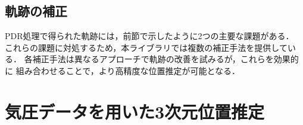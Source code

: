 


\subsection{軌跡の補正}

PDR処理で得られた軌跡には，前節で示したように2つの主要な課題がある．
これらの課題に対処するため，本ライブラリでは複数の補正手法を提供している．
各補正手法は異なるアプローチで軌跡の改善を試みるが，これらを効果的に
組み合わせることで，より高精度な位置推定が可能となる．








\section{気圧データを用いた3次元位置推定}



